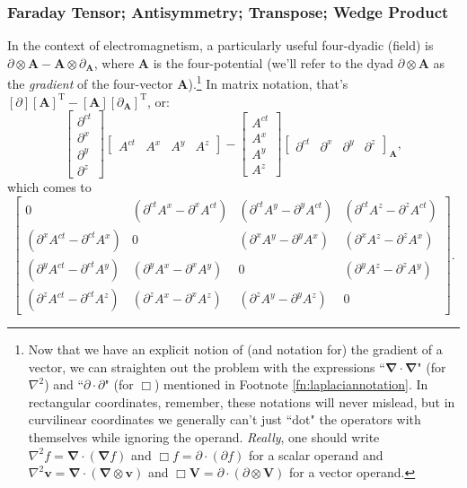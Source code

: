 \documentclass[12pt]{article}
\renewcommand{\vv}[1]{\mathbf{#1}}
\newcommand{\del}{\boldsymbol{\nabla}}
\begin{document}
\subsubsection{Faraday Tensor; Antisymmetry; Transpose; Wedge Product}\label{sssec:faraday}

In the context of electromagnetism, a particularly useful four-dyadic (field) is $\partialup \otimes \vv A - \vv A \otimes \partialup_{\vv A}$, where $\vv A$ is the four-potential (we'll refer to the dyad $\partialup \otimes \vv A$ as the \emph{gradient} of the four-vector $\vv A$).\footnote{\label{fn:laplaciannotationresolved}Now that we have an explicit notion of (and notation for) the gradient of a vector, we can straighten out the problem with the expressions ``$\del \cdot \del$" (for $\nabla^2$) and ``$\partialup \cdot \partialup$" (for $\Box$) mentioned in Footnote \ref{fn:laplaciannotation}. In rectangular coordinates, remember, these notations will never mislead, but in curvilinear coordinates we generally can't just ``dot" the operators with themselves while ignoring the operand. \emph{Really}, one should write $\nabla^2 f = \del \cdot (\del f)$ and $\Box f = \partialup \cdot (\partialup f)$ for a scalar operand and $\nabla^2 \vv v = \del \cdot (\del \otimes \vv v)$ and $\Box \vv V = \partialup \cdot (\partialup \otimes \vv V)$ for a vector operand.} In matrix notation, that's ${[\partialup][\vv A]^{\mathrm{T}} - [\vv A][\partialup_{\vv A}]^{\mathrm{T}}}$, or:
\begin{equation*}
\begin{bmatrix}
\partial^{ct} \\
\partial^x \\
\partial^y \\
\partial^z
\end{bmatrix}
\begin{bmatrix}
A^{ct} & A^x & A^y & A^z
\end{bmatrix}
-
\begin{bmatrix}
A^{ct} \\
A^x \\
A^y \\
A^z
\end{bmatrix}
\begin{bmatrix}
\partial^{ct} & \partial^x & \partial^y & \partial^z
\end{bmatrix}_{\vv A},
\end{equation*}
which comes to
\begin{equation*}
\begin{bmatrix}
0 & ( \partial^{ct} A^x - \partial^x A^{ct} ) & ( \partial^{ct} A^y - \partial^y A^{ct} ) & ( \partial^{ct} A^z - \partial^z A^{ct} ) \\[1.5ex]
( \partial^x A^{ct} - \partial^{ct} A^x ) & 0 & ( \partial^x A^y - \partial^y A^x ) & ( \partial^x A^z - \partial^z A^x ) \\[1.5ex]
( \partial^y A^{ct} - \partial^{ct} A^y ) & ( \partial^y A^x - \partial^x A^y ) & 0 & ( \partial^y A^z - \partial^z A^y ) \\[1.5ex]
( \partial^z A^{ct} - \partial^{ct} A^z ) & ( \partial^z A^x - \partial^x A^z ) & ( \partial^z A^y - \partial^y A^z ) & 0
\end{bmatrix} .
\end{equation*}
\end{document}
